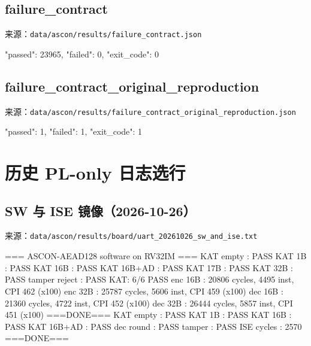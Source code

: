 \Needspace{126pt}

\subsection{failure\_contract}\label{failure_contract}

来源：\texttt{data/\allowbreak{}ascon/\allowbreak{}results/\allowbreak{}failure\_\allowbreak{}contract.\allowbreak{}json}

\begin{codeblock}[samepage=true]
{
  "passed": 23965,
  "failed": 0,
  "exit_code": 0
}
\end{codeblock}

\Needspace{135pt}

\subsection{failure\_contract\_original\_reproduction}\label{failure_contract_original_reproduction}

来源：\texttt{data/\allowbreak{}ascon/\allowbreak{}results/\allowbreak{}failure\_\allowbreak{}contract\_\allowbreak{}original\_\allowbreak{}reproduction.\allowbreak{}json}

\begin{codeblock}[samepage=true]
{
  "passed": 1,
  "failed": 1,
  "exit_code": 1
}
\end{codeblock}

\Needspace{85pt}

\section{历史 PL-only 日志选行}\label{ux5386ux53f2-pl-only-ux65e5ux5fd7ux9009ux884c}

\Needspace{85pt}

\subsection{SW 与 ISE 镜像（2026-10-26）}\label{sw-ux4e0e-ise-ux955cux50cf2026-10-26}

来源：\texttt{data/\allowbreak{}ascon/\allowbreak{}results/\allowbreak{}board/\allowbreak{}uart\_\allowbreak{}20261026\_\allowbreak{}sw\_\allowbreak{}and\_\allowbreak{}ise.\allowbreak{}txt}

\begin{codeblock}
=== ASCON-AEAD128 software on RV32IM ===
KAT empty : PASS
KAT 1B : PASS
KAT 16B : PASS
KAT 16B+AD : PASS
KAT 17B : PASS
KAT 32B : PASS
tamper reject : PASS
KAT: 6/6 PASS
enc 16B : 20806 cycles, 4495 inst, CPI 462 (x100)
enc 32B : 25787 cycles, 5606 inst, CPI 459 (x100)
dec 16B : 21360 cycles, 4722 inst, CPI 452 (x100)
dec 32B : 26444 cycles, 5857 inst, CPI 451 (x100)
===DONE===
KAT empty  : PASS
KAT 1B     : PASS
KAT 16B    : PASS
KAT 16B+AD : PASS
dec round  : PASS
tamper     : PASS
ISE cycles   : 2570
===DONE===
\end{codeblock}

